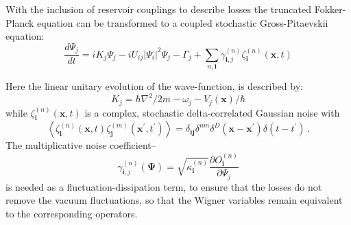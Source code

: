 \documentclass[aps,prl,twocolumn,showpacs,amsmath,amssymb,superscriptaddress]{revtex4-1}
\newcommand{\xvec}{\boldsymbol{x}}
\newcommand{\ivec}{\boldsymbol{i}}
\newcommand{\jvec}{\boldsymbol{j}}
\newcommand{\Psivec}{\boldsymbol{\Psi}}
\begin{document}
With the inclusion of reservoir couplings to describe losses
the truncated Fokker-Planck equation can be transformed
to a coupled stochastic Gross-Pitaevskii equation:
\begin{equation}
	\frac{d\Psi_{j}}{dt} = iK_{j} \Psi_{j} - iU_{ij} \lvert \Psi_{i} \rvert ^{2} \Psi_{j} -
	\Gamma_{j} + \sum_{n,\ivec} \gamma_{\ivec,j}^{(n)} \zeta_{\ivec}^{(n)} (\xvec,t)
\end{equation}

Here the linear unitary evolution of the wave-function, is described by:
\begin{equation}
	K_{j} = \hbar \nabla^{2}/2m - \omega_{j} - V_{j} \left( \xvec \right) / \hbar
\end{equation}
while $\zeta_{\ivec}^{(n)}(\xvec, t)$ is a complex,
stochastic delta-correlated Gaussian noise with
\begin{equation}
	\left\langle
		\zeta_{\ivec}^{(n)} (\xvec,t) \zeta_{\jvec}^{(m)}(\xvec^\prime, t^\prime)
	\right\rangle =
	\delta_{\ivec \jvec} \delta^{nm} \delta^{D} \left(
		\xvec - \xvec^\prime
	\right)
	\delta \left( t - t^\prime \right)\,.
\end{equation}
The multiplicative noise coefficient\---
\begin{equation}
	\gamma_{\ivec,j}^{(n)} \left( \Psivec \right) =
	\sqrt{\kappa_{\ivec}^{(n)}}
	\frac{\partial O_{\ivec}^{(n)}}{\partial\Psi_{j}}
\end{equation}
is needed as a fluctuation-dissipation term,
to ensure that the losses do not remove the vacuum fluctuations,
so that the Wigner variables remain equivalent to the corresponding operators.
\end{document}
